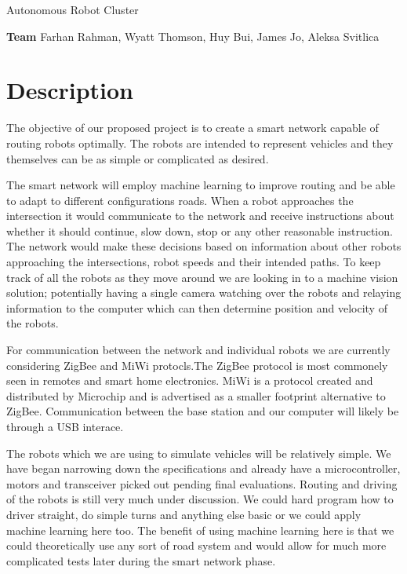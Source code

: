 \documentclass[a4paper]{article}
\begin{document}
	\begin{center}
		\huge Autonomous Robot Cluster
	\end{center}
	\textbf{Team} Farhan Rahman, Wyatt Thomson, Huy Bui, James Jo, Aleksa Svitlica \\

	\section*{Description}
		\par 
		The objective of our proposed project is to create a smart network capable of routing robots optimally. The robots are intended to represent vehicles and they themselves can be as simple or complicated as desired. \par
		The smart network will employ machine learning to improve routing and be able to adapt to different configurations roads. When a robot approaches the intersection it would communicate to the network and receive instructions about whether it should continue, slow down, stop or any other reasonable instruction. The network would make these decisions based on information about other robots approaching the intersections, robot speeds and their intended paths. To keep track of all the robots as they move around we are looking in to a machine vision solution; potentially having a single camera watching over the robots and relaying information to the computer which can then determine position and velocity of the robots. \par
		For communication between the network and individual robots we are currently considering ZigBee and MiWi protocls.The ZigBee protocol is most commonely seen in remotes and smart home electronics. MiWi is a protocol created and distributed by Microchip and is advertised as a smaller footprint alternative to ZigBee. Communication between the base station and our computer will likely be through a USB interace.\par
		The robots which we are using to simulate vehicles will be relatively simple. We have began narrowing down the specifications and already have a microcontroller, motors and transceiver picked out pending final evaluations. Routing and driving of the robots is still very much under discussion. We could hard program how to driver straight, do simple turns and anything else basic or we could apply machine learning here too. The benefit of using machine learning here is that we could theoretically use any sort of road system and would allow for much more complicated tests later during the smart network phase. \\  
		 
\end{document}
